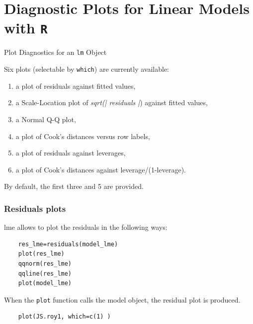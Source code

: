 \documentclass[a4paper,12pt]{article}
\begin{document}
\section{Diagnostic Plots for Linear Models with \texttt{R}}
Plot Diagnostics for an \texttt{lm} Object


Six plots (selectable by \texttt{which}) are currently available: 
\begin{enumerate}
	\item a plot of residuals against fitted values, 
	\item a Scale-Location plot of \textit{sqrt(| residuals |}) against fitted values, 
	\item a Normal Q-Q plot, 
	\item a plot of Cook's distances versus row labels, 
	\item a plot of residuals against leverages, 
	\item a plot of Cook's distances against leverage/(1-leverage).
\end{enumerate} By default, the first three and 5 are provided.
\subsubsection{Residuals plots}

lme allows to plot the residuals in the following ways:

\begin{framed}
	\begin{verbatim}
	res_lme=residuals(model_lme)
	plot(res_lme)
	qqnorm(res_lme)
	qqline(res_lme)
	plot(model_lme)
	\end{verbatim}
\end{framed}

When the \texttt{plot} function calls the model object, the residual plot is produced.




\begin{framed}
	\begin{verbatim}
	plot(JS.roy1, which=c(1) )
	\end{verbatim}
\end{framed}
\end{document}
